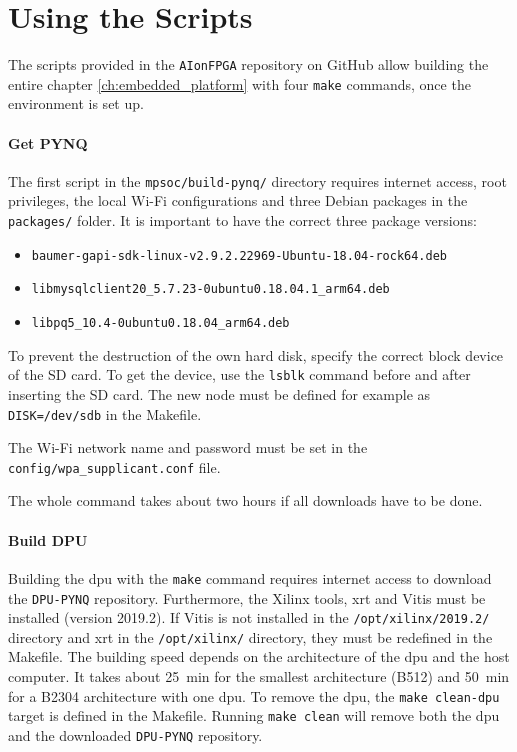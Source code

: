\section{Using the Scripts}
\label{sec:embedded_platform:using_scripts}

The scripts provided in the \texttt{AIonFPGA} repository on GitHub allow building the entire chapter \ref{ch:embedded_platform} with four \texttt{make} commands, once the environment is set up.

\paragraph{Get PYNQ}
The first script in the \texttt{mpsoc/build-pynq/} directory requires internet access, root privileges, the local Wi-Fi configurations and three Debian packages in the \texttt{packages/} folder.
It is important to have the correct three package versions:
\begin{itemize}
	 \item \texttt{baumer-gapi-sdk-linux-v2.9.2.22969-Ubuntu-18.04-rock64.deb}
	 \item \texttt{libmysqlclient20\_5.7.23-0ubuntu0.18.04.1\_arm64.deb}
	 \item \texttt{libpq5\_10.4-0ubuntu0.18.04\_arm64.deb}
\end{itemize}

To prevent the destruction of the own hard disk, specify the correct block device of the SD card.
To get the device, use the \texttt{lsblk} command before and after inserting the SD card.
The new node must be defined for example as \texttt{DISK=/dev/sdb} in the Makefile.

The Wi-Fi network name and password must be set in the \texttt{config/wpa\_supplicant.conf} file.

The whole command takes about two hours if all downloads have to be done.

\paragraph{Build DPU}
Building the \acrshort{dpu} with the \texttt{make} command requires internet access to download the \texttt{DPU-PYNQ} repository.
Furthermore, the Xilinx tools, \acrshort{xrt} and Vitis must be installed (version 2019.2).
If Vitis is not installed in the \texttt{/opt/xilinx/2019.2/} directory and \acrshort{xrt} in the \texttt{/opt/xilinx/} directory, they must be redefined in the Makefile.
The building speed depends on the architecture of the \acrshort{dpu} and the host computer.
It takes about \SI{25}{min} for the smallest architecture (B512) and \SI{50}{min} for a B2304 architecture with one \acrshort{dpu}.
To remove the \acrshort{dpu}, the \texttt{make clean-dpu} target is defined in the Makefile.
Running \texttt{make clean} will remove both the \acrshort{dpu} and the downloaded \texttt{DPU-PYNQ} repository.

